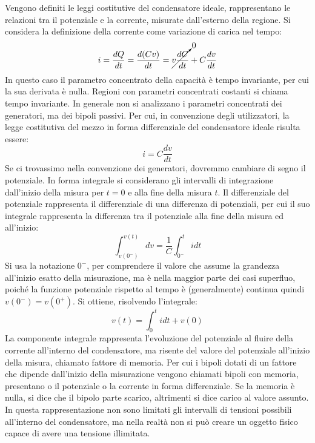 \documentclass{article}
\numberwithin{equation}{subsection}
\begin{document}
Vengono definiti le leggi costitutive del condensatore ideale, rappresentano le relazioni tra il potenziale e la corrente, misurate dall'esterno della regione. 
Si considera la definizione della corrente come variazione di carica nel tempo:
\begin{equation*}
    i=\displaystyle\frac{dQ}{dt}=\frac{d(Cv)}{dt}=\cancelto{0}{v\frac{dC}{dt}}+C\frac{dv}{dt}
\end{equation*}
In questo caso il parametro concentrato della capacità è tempo invariante, per cui la sua derivata è nulla. Regioni con parametri concentrati costanti si chiama tempo 
invariante. In generale non si analizzano i parametri concentrati dei generatori, ma dei bipoli passivi. Per cui, in convenzione degli utilizzatori, la legge costitutiva del 
mezzo in forma differenziale del condensatore ideale risulta essere:
\begin{equation}
    i=\displaystyle C\frac{dv}{dt}
\end{equation}
Se ci trovassimo nella convenzione dei generatori, dovremmo cambiare di segno il potenziale. In forma integrale si considerano gli intervalli di integrazione dall'inizio 
della misura per $t=0$ e alla fine della misura $t$. Il differenziale del potenziale rappresenta il differenziale di una differenza di potenziali, per cui il suo integrale rappresenta la differenza tra il potenziale alla fine della misura ed all'inizio:
\begin{equation*}
    \displaystyle\int_{v(0^-)}^{v(t)}dv=\frac{1}{C}\int_{0^-}^tidt
\end{equation*}
Si usa la notazione $0^-$, per comprendere il valore che assume la grandezza all'inizio esatto della misurazione, ma è nella maggior parte dei casi superfluo, poiché la funzione 
potenziale rispetto al tempo è (generalmente) continua quindi $v(0^-)=v(0^+)$. Si ottiene, risolvendo l'integrale:
\begin{equation*}
    v(t)=\displaystyle\int_0^tidt+v(0)
\end{equation*}
La componente integrale rappresenta l'evoluzione del potenziale al fluire della corrente all'interno del condensatore, ma risente del valore del potenziale all'inizio della misura, 
chiamato fattore di memoria. Per cui i bipoli dotati di un fattore che dipende dall'inizio della misurazione vengono chiamati bipoli con memoria, presentano o il potenziale 
o la corrente in forma differenziale. Se la memoria è nulla, si dice che il bipolo parte scarico, altrimenti si dice carico al valore assunto. In questa rappresentazione non 
sono limitati gli intervalli di tensioni possibili all'interno del condensatore, ma nella realtà non si può creare un oggetto fisico capace di avere una tensione illimitata. 
\end{document}
